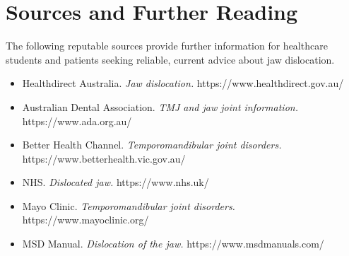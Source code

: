 \section*{Sources and Further Reading}
The following reputable sources provide further information for healthcare students and patients seeking reliable, current advice about jaw dislocation.
\begin{itemize}
    \item Healthdirect Australia. \textit{Jaw dislocation.} https://www.healthdirect.gov.au/
    \item Australian Dental Association. \textit{TMJ and jaw joint information.} https://www.ada.org.au/
    \item Better Health Channel. \textit{Temporomandibular joint disorders.} https://www.betterhealth.vic.gov.au/
    \item NHS. \textit{Dislocated jaw.} https://www.nhs.uk/
    \item Mayo Clinic. \textit{Temporomandibular joint disorders.} https://www.mayoclinic.org/
    \item MSD Manual. \textit{Dislocation of the jaw.} https://www.msdmanuals.com/
\end{itemize}
